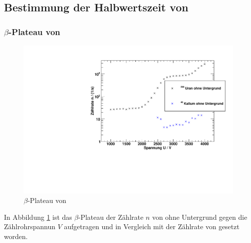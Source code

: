 
\subsection{Bestimmung der Halbwertszeit von \kalium}
\subsubsection{$\beta$-Plateau von \kalium}
\begin{figure}[H]
\begin{center}
  \includegraphics[width=15cm]{../img/Kalium40_Charakteristik.pdf}
  \caption[$\beta$-Plateau mit \samarium]{$\beta$-Plateau von \kalium}
  \label{img:char:kalium}
\end{center}
\end{figure}
In Abbildung \ref{img:char:kalium} ist das $\beta$-Plateau der Zählrate $n$ von \kalium ohne Untergrund gegen die Zählrohrspannun $V$ aufgetragen 
und in Vergleich mit der Zählrate von \uran gesetzt worden.

